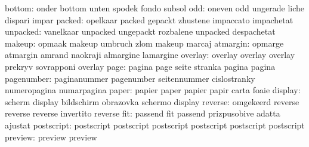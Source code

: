                    bottom: onder                     bottom
                           unten                     spodek
                           fondo                     subsol
                      odd: oneven                    odd
                           ungerade                  liche
                           dispari                   impar
                   packed: opelkaar                  packed
                           gepackt                   zhustene
                           impaccato                 impachetat
                 unpacked: vanelkaar                 unpacked
                           ungepackt                 rozbalene
                           unpacked                  despachetat
                   makeup: opmaak                    makeup
                           umbruch                   zlom
                           makeup                    marcaj
                 atmargin: opmarge                   atmargin
                           amrand                    naokraji
                           almargine                 lamargine
                  overlay: overlay                   overlay
                           overlay                   prekryv
                           sovrapponi                overlay
                     page: pagina                    page
                           seite                     stranka
                           pagina                    pagina
               pagenumber: paginanummer              pagenumber
                           seitennummer              cislostranky
                           numeropagina              numarpagina
                    paper: papier                    paper
                           papier                    papir
                           carta                     foaie
                  display: scherm                    display
                           bildschirm                obrazovka
                           schermo                   display %
                  reverse: omgekeerd                 reverse
                           reverse                   reverse
                           invertito                 reverse %
                      fit: passend                   fit
                           passend                   prizpusobive
                           adatta                    ajustat
               postscript: postscript                postscript
                           postscript                postscript
                           postscript                postscript
                  preview: preview                   preview
